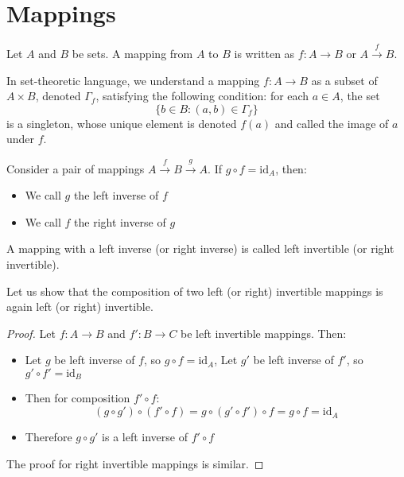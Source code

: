 \documentclass[11pt,lang=en]{elegantbook}
\begin{document}
\section{Mappings}

\begin{definition}[Mapping]
  Let $A$ and $B$ be sets. A mapping from $A$ to $B$ is written as $f : A \to B$ or $A \xrightarrow{f} B$.
  
  In set-theoretic language, we understand a mapping $f : A \to B$ as a subset of $A \times B$, denoted $\Gamma_f$, satisfying the following condition: for each $a \in A$, the set
  \[
    \{b \in B : (a,b) \in \Gamma_f\}
  \]
  is a singleton, whose unique element is denoted $f(a)$ and called the image of $a$ under $f$.
\end{definition}

\begin{definition}
  Consider a pair of mappings $A \xrightarrow{f} B \xrightarrow{g} A$. 
  If $g \circ f = \text{id}_A$, then:
  \begin{itemize}
    \item We call $g$ the left inverse of $f$
    \item We call $f$ the right inverse of $g$
  \end{itemize}
  A mapping with a left inverse (or right inverse) is called left invertible (or right invertible).
\end{definition}

\begin{example}
  Let us show that the composition of two left (or right) invertible mappings is again left (or right) invertible.
  
  \begin{proof}
    Let $f: A \to B$ and $f': B \to C$ be left invertible mappings. Then:
    \begin{itemize}
      \item Let $g$ be left inverse of $f$, so $g \circ f = \text{id}_A$, Let $g'$ be left inverse of $f'$, so $g' \circ f' = \text{id}_B$
      \item Then for composition $f' \circ f$:
        \[
          (g \circ g') \circ (f' \circ f) = g \circ (g' \circ f') \circ f = g \circ f = \text{id}_A
        \]
      \item Therefore $g \circ g'$ is a left inverse of $f' \circ f$
    \end{itemize}
    The proof for right invertible mappings is similar.
  \end{proof}
\end{example}
\end{document}
